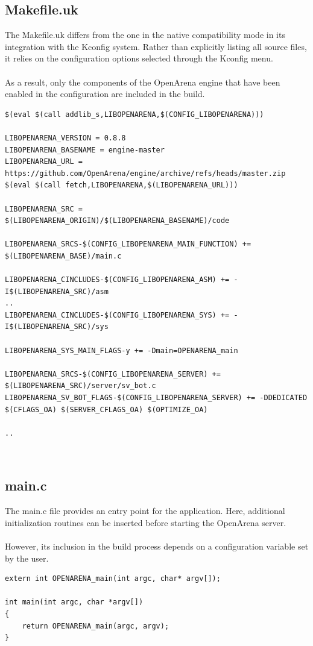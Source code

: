 \subsection{Makefile.uk}
The Makefile.uk differs from the one in the native compatibility mode in its integration with the Kconfig system.
Rather than explicitly listing all source files, it relies on the configuration options selected through the Kconfig menu. \\ \\
As a result, only the components of the OpenArena engine that have been enabled in the configuration are included in the build.
\\
\lstset{basicstyle=\small\ttfamily, caption= Part of Makefile.uk, language=make, showstringspaces=false, keepspaces=true}
\begin{lstlisting}
$(eval $(call addlib_s,LIBOPENARENA,$(CONFIG_LIBOPENARENA)))

LIBOPENARENA_VERSION = 0.8.8
LIBOPENARENA_BASENAME = engine-master
LIBOPENARENA_URL = https://github.com/OpenArena/engine/archive/refs/heads/master.zip
$(eval $(call fetch,LIBOPENARENA,$(LIBOPENARENA_URL)))

LIBOPENARENA_SRC = $(LIBOPENARENA_ORIGIN)/$(LIBOPENARENA_BASENAME)/code

LIBOPENARENA_SRCS-$(CONFIG_LIBOPENARENA_MAIN_FUNCTION) += $(LIBOPENARENA_BASE)/main.c

LIBOPENARENA_CINCLUDES-$(CONFIG_LIBOPENARENA_ASM) += -I$(LIBOPENARENA_SRC)/asm
..
LIBOPENARENA_CINCLUDES-$(CONFIG_LIBOPENARENA_SYS) += -I$(LIBOPENARENA_SRC)/sys

LIBOPENARENA_SYS_MAIN_FLAGS-y += -Dmain=OPENARENA_main

LIBOPENARENA_SRCS-$(CONFIG_LIBOPENARENA_SERVER) += $(LIBOPENARENA_SRC)/server/sv_bot.c
LIBOPENARENA_SV_BOT_FLAGS-$(CONFIG_LIBOPENARENA_SERVER) += -DDEDICATED $(CFLAGS_OA) $(SERVER_CFLAGS_OA) $(OPTIMIZE_OA)

..
\end{lstlisting}
\\
\subsection{main.c}
The main.c file provides an entry point for the application. Here, additional initialization routines can be inserted before starting the OpenArena server. \\ \\
However, its inclusion in the build process depends on a configuration variable set by the user.
\\
\lstset{basicstyle=\small\ttfamily, caption= main.c, language=C, showstringspaces=false, keepspaces=true}
\begin{lstlisting}
extern int OPENARENA_main(int argc, char* argv[]);

int main(int argc, char *argv[])
{
    return OPENARENA_main(argc, argv);
}
\end{lstlisting}
\\
